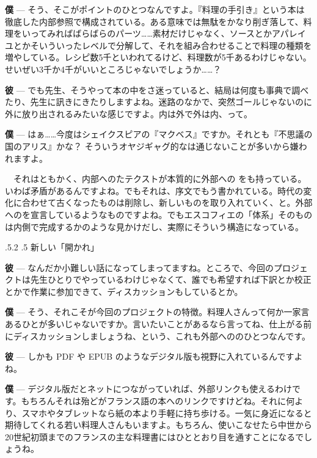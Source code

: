 \documentclass[14Q,]{ltjsbook}
\makeatletter
\renewcommand{\headfont}{\gtfamily\sffamily\bfseries}%
\renewcommand{\subsection}{\@startsection{subsection}{2}{\z@}%
    {\Cvs \@plus.5\Cdp \@minus.2\Cdp}%
    {.5\Cvs}
    {\normalfont\large\headfont\centering}} %
\renewcommand{\ldots}{\noindent…}
\makeatother
\begin{document}
\textbf{僕} ---
そう、そこがポイントのひとつなんですよ。『料理の手引き』という本は徹底した内部参照で構成されている。ある意味では無駄をかなり削ぎ落して、料理をいってみればばらばらのパーツ\ldots{}\ldots{}素材だけじゃなく、ソースとかアパレイユとかそいういったレベルで分解して、それを組み合わせることで料理の種類を増やしている。レシピ数5千といわれてるけど、料理数が5千あるわけじゃない。せいぜい3千か4千がいいところじゃないでしょうか\ldots{}\ldots{}？

\textbf{彼} ---
でも先生、そうやって本の中をさ迷っていると、結局は何度も事典で調べたり、先生に訊きにきたりしますよね。迷路のなかで、突然ゴールじゃないのに外に放り出されるみたいな感じですよ。内は外で外は内、って。

\textbf{僕} ---
はぁ\ldots{}\ldots{}今度はシェイクスピアの『マクベス』ですか。それとも『不思議の国のアリス』かな？
そういうオヤジギャグ的なは通じないことが多いから嫌われますよ。

　それはともかく、内部へのたテクストが本質的に外部への
をも持っている。いわば矛盾があるんですよね。でもそれは、序文でもう書かれている。時代の変化に合わせて古くなったものは削除し、新しいものを取り入れていく、と。外部へのを宣言しているようなものですよね。でもエスコフィエの「体系」そのものは内側で完成するかのような見かけだし、実際にそういう構造になっている。

\hypertarget{novella-opera-aperta}{%
\subsection{新しい「開かれ」}\label{novella-opera-aperta}}

\textbf{彼} ---
なんだか小難しい話になってしまってますね。ところで、今回のプロジェクトは先生ひとりでやっているわけじゃなくて、誰でも希望すれば下訳とか校正とかで作業に参加できて、ディスカッションもしているとか。

\textbf{僕} ---
そう、それこそが今回のプロジェクトの特徴。料理人さんって何か一家言あるひとが多いじゃないですか。言いたいことがあるなら言ってね、仕上がる前にディスカッションしましょうね、という、これも外部へののひとつなんです。

\textbf{彼} --- しかも PDF や EPUB
のようなデジタル版も視野に入れているんですよね。

\textbf{僕} ---
デジタル版だとネットにつながっていれば、外部リンクも使えるわけです。もちろんそれは殆どがフランス語の本へのリンクですけどね。それに何より、スマホやタブレットなら紙の本より手軽に持ち歩ける。一気に身近になると期待してくれる若い料理人さんもいますよ。もちろん、使いこなせたら中世から20世紀初頭までのフランスの主な料理書にはひととおり目を通すことになるでしょうね。
\end{document}
